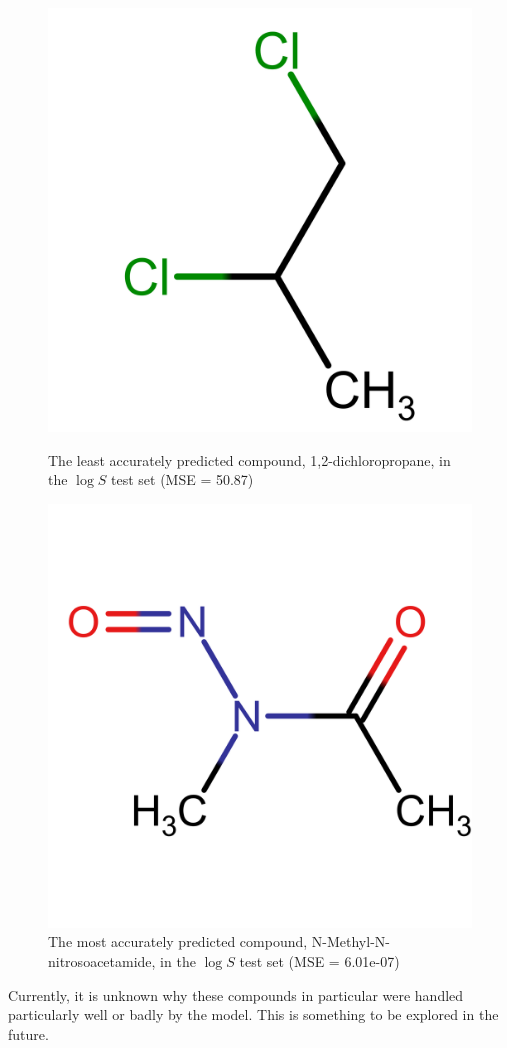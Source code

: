 \documentclass[11pt, titlepage]{article}
\begin{document}
\begin{figure}[H]
	\begin{minipage}{0.5\linewidth}
		\centering
		\small
		\includegraphics[width = 0.5\linewidth]{figures/logSWorst.png}
		\caption{The least accurately predicted compound, 1,2-dichloropropane\cite{WorstLogSName},  in the $\log S$ test set (MSE = 50.87)}
		\label{fig:WorstLogS}
	\end{minipage}
	\begin{minipage}{0.5\linewidth}
		\centering
		\small
		\includegraphics[width = 0.5\linewidth]{figures/logSBest.png}
		\caption{The most accurately predicted compound, N-Methyl-N-nitrosoacetamide\cite{WorstLogSName},  in the $\log S$ test set (MSE = 6.01e-07)}
		\label{fig:BestLogS}
	\end{minipage}
\end{figure}

Currently, it is unknown why these compounds in particular were handled particularly well or badly by the model. This is something to be explored in the future.
\end{document}
